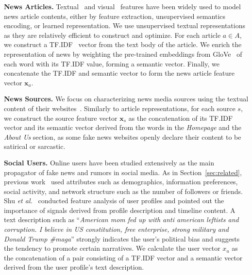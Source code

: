 \documentclass[sigconf]{acmart}
\theoremstyle{definition}
\theoremstyle{hypothesis}
\begin{document}
\textbf{News Articles.} Textual~\cite{castillo2011information,yang2012automatic,shu2019beyond,popat2018credeye} and visual~\cite{wang2018eann,khattar2019mvae} features have been widely used to model news article contents, either by feature extraction, unsupervised semantics encoding, or learned representation. %
We use unsupervised textual representations as they are relatively efficient to construct and optimize.
For each article $a\in A$, we construct a 
TF.IDF~\cite{Salton83} vector 
from the text body of the article. 
We enrich the representation of news by weighting the pre-trained embeddings from GloVe~\cite{pennington2014glove} of each word with its TF.IDF value, forming a semantic vector. Finally, we concatenate the TF.IDF and semantic vector to form the news article feature vector $\boldsymbol{x}_a$.

\textbf{News Sources.} 
We focus on characterizing news media sources using the textual content of their websites~\cite{baly2018predicting,kulkarni2018multi}. Similarly to article representations, for each source $s$, we construct the source feature vector $\boldsymbol{x}_s$ as the concatenation of its TF.IDF vector and its semantic vector derived from 
the words in the \emph{Homepage} and the \emph{About Us} section, as some fake news websites openly declare their content to be satirical or sarcastic.

\textbf{Social Users.} Online users have been studied extensively as the main propagator of fake news and rumors in social media. As in Section~\ref{sec:related}, previous work~\cite{castillo2011information,yang2012automatic} used attributes such as demographics, information preferences, social activity, and network structure such as the number of followers or 
friends. 
Shu {\it et al.}~\cite{shu2019beyond} conducted feature analysis of user profiles and pointed out the importance of signals derived from profile description and timeline content. A text description such as ``\emph{American mom fed up with anti american leftists and corruption. I believe in US constitution, free enterprise, strong military and Donald Trump \#maga}'' strongly indicates the user's political bias and suggests the tendency to promote certain narratives. We calculate the user vector $x_u$ as the concatenation of a pair consisting of a TF.IDF vector and a semantic vector derived from the user profile's text description. 
\end{document}
